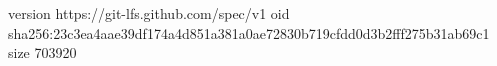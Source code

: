 version https://git-lfs.github.com/spec/v1
oid sha256:23c3ea4aae39df174a4d851a381a0ae72830b719cfdd0d3b2fff275b31ab69c1
size 703920

